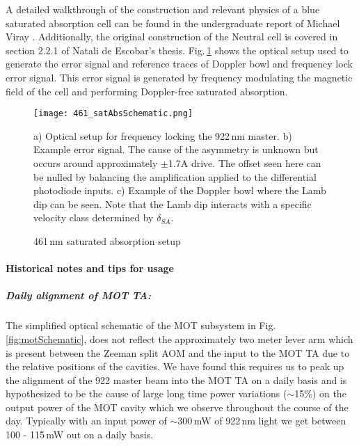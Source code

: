 A detailed walkthrough of the construction and relevant physics of a blue saturated absorption cell can be found in the undergraduate report of Michael Viray \cite{MichaelViray2014}.
Additionally, the original construction of the Neutral cell is covered in section 2.2.1 of Natali de Escobar's thesis.
Fig.\,\ref{fig:blueSatAbs} shows the optical setup used to generate the error signal and reference traces of Doppler bowl and frequency lock error signal.
This error signal is generated by frequency modulating the magnetic field of the cell and performing Doppler-free saturated absorption.
	\begin{figure} 
		\centerline{
		\texttt{[image: 461\_satAbsSchematic.png]}}
		\caption{461\,nm saturated absorption setup}{a) Optical setup for frequency locking the 922\,nm master. b) Example error signal. The cause of the asymmetry is unknown but occurs around approximately $\pm$1.7A drive. The offset seen here can be nulled by balancing the amplification applied to the differential photodiode inputs. c) Example of the Doppler bowl where the Lamb dip can be seen. Note that the Lamb dip interacts with a specific velocity class determined by $\delta_{SA}$.}
		\label{fig:blueSatAbs}
	\end{figure}

\paragraph{Historical notes and tips for usage}
\subparagraph{Daily alignment of MOT TA:}
The simplified optical schematic of the MOT subsystem in Fig.\,\ref{fig:motSchematic}, does not reflect the approximately two meter lever arm which is present between the Zeeman split AOM and the input to the MOT TA due to the relative positions of the cavities.
We have found this requires us to peak up the alignment of the 922 master beam into the MOT TA on a daily basis and is hypothesized to be the cause of large long time power variations ($\sim$15\%) on the output power of the MOT cavity which we observe throughout the course of the day.
Typically with an input power of $\sim$300\,mW of 922\,nm light we get between 100 - 115\,mW out on a daily basis.

